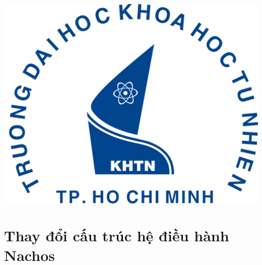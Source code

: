 \begin{titlepage}




\includegraphics{image/logo/logo-hcmus.png}\\[1cm] %
 

\vfill %

\end{titlepage}

\renewcommand*\contentsname{Mục lục}
\tableofcontents
\vfill


\section{Thay đổi cấu trúc hệ điều hành Nachos}
